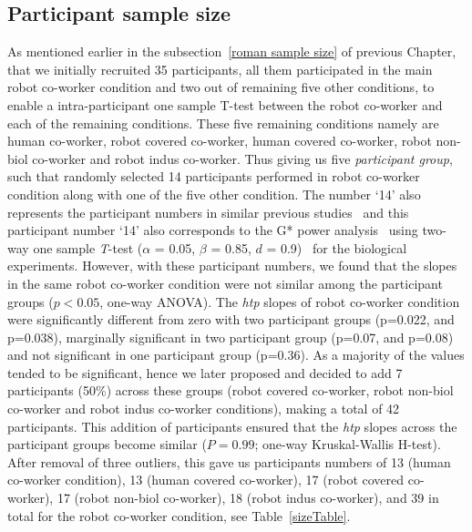 \subsection{Participant sample size}

As mentioned earlier in the subsection~\ref{roman sample size} of previous Chapter, that we initially recruited 35 participants, all them participated in the main robot co-worker condition and two out of remaining five other conditions, to enable a intra-participant one sample T-test between the robot co-worker and each of the remaining conditions. These five remaining conditions namely are human co-worker, robot covered co-worker, human covered co-worker, robot non-biol co-worker and robot indus co-worker. Thus giving us five \textit{participant group}, such that randomly selected 14 participants performed in robot co-worker condition along with one of the five other condition. The number `14' also represents the participant numbers in similar previous studies~\cite{Bisio:PlosOne:2010, Bisio:PlosOne:2014} and this participant number `14' also corresponds to the G* power analysis~\cite{Erdfelder:JBRMIC:1996} using two-way one sample {\it T}-test ($\alpha$ = 0.05, $\beta$ = 0.85, $d$ = 0.9)~\cite{Verma:power_analysis:2017} for the biological experiments. However, with these participant numbers, we found that the slopes in the same robot co-worker condition were not similar among the participant groups ($p<0.05$, one-way ANOVA). The {\it htp} slopes of robot co-worker condition were significantly different from zero with two participant groups (p=0.022, and p=0.038), marginally significant in two participant group (p=0.07, and p=0.08) and not significant in one participant group (p=0.36). As a majority of the values tended to be significant, hence we later proposed and decided to add 7 participants (50\%) across these groups (robot covered co-worker, robot non-biol co-worker and robot indus co-worker conditions), making a total of 42 participants. This addition of participants ensured that the {\it htp} slopes across the participant groups become similar ($P = 0.99$; one-way Kruskal-Wallis H-test). After removal of three outliers, this gave us participants numbers of 13 (human co-worker condition), 13 (human covered co-worker), 17 (robot covered co-worker), 17 (robot non-biol co-worker), 18 (robot indus co-worker), and 39 in total for the robot co-worker condition, see Table~\ref{sizeTable}.


